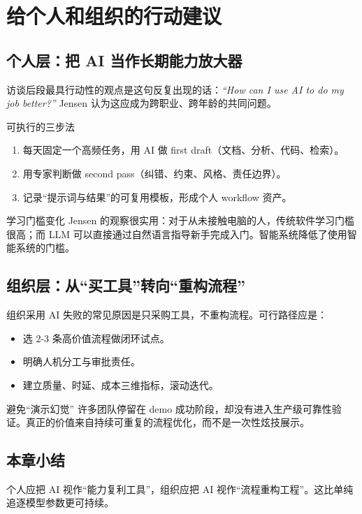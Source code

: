 \section{给个人和组织的行动建议}

\subsection{个人层：把 AI 当作长期能力放大器}

访谈后段最具行动性的观点是这句反复出现的话：\textit{``How can I use AI to do my job better?''} Jensen 认为这应成为跨职业、跨年龄的共同问题。

\begin{knowledgebox}{可执行的三步法}
\begin{enumerate}
    \item 每天固定一个高频任务，用 AI 做 first draft（文档、分析、代码、检索）。
    \item 用专家判断做 second pass（纠错、约束、风格、责任边界）。
    \item 记录“提示词与结果”的可复用模板，形成个人 workflow 资产。
\end{enumerate}
\end{knowledgebox}

\begin{importantbox}{学习门槛变化}
Jensen 的观察很实用：对于从未接触电脑的人，传统软件学习门槛很高；而 LLM 可以直接通过自然语言指导新手完成入门。智能系统降低了使用智能系统的门槛。
\end{importantbox}

\subsection{组织层：从“买工具”转向“重构流程”}

组织采用 AI 失败的常见原因是只采购工具，不重构流程。可行路径应是：
\begin{itemize}
    \item 选 2-3 条高价值流程做闭环试点。
    \item 明确人机分工与审批责任。
    \item 建立质量、时延、成本三维指标，滚动迭代。
\end{itemize}

\begin{warningbox}{避免“演示幻觉”}
许多团队停留在 demo 成功阶段，却没有进入生产级可靠性验证。真正的价值来自持续可重复的流程优化，而不是一次性炫技展示。
\end{warningbox}

\subsection{本章小结}
个人应把 AI 视作“能力复利工具”，组织应把 AI 视作“流程重构工程”。这比单纯追逐模型参数更可持续。

